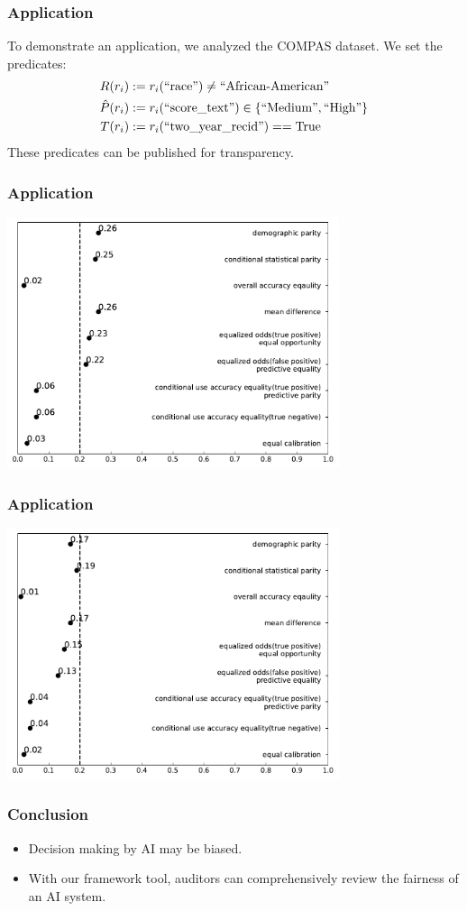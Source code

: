 \documentclass{beamer}
\DeclarePairedDelimiter{\set}{\{}{\}}
\begin{document}
\begin{frame}
    \frametitle{Application}
    To demonstrate an application, we analyzed the COMPAS dataset.
    We set the predicates:
    \begin{align*}
        \priv(r_i) & := r_i(\text{``race''}) \neq \text{``African-American''}\\
        \pos(r_i)  & := r_i(\text{``score\_text''}) \in \set{\text{``Medium''},\text{``High''}}\\
        \tru(r_i)  & := r_i(\text{``two\_year\_recid''}) == \text{True}
    \end{align*}
    These predicates can be published for transparency.
\end{frame}

\begin{frame}
    \frametitle{Application}
    \centering
    \includegraphics[width=0.73\textwidth]{African-American}
\end{frame}

\begin{frame}
    \frametitle{Application}
    \centering
    \includegraphics[width=0.73\textwidth]{Caucasian}
\end{frame}

\begin{frame}
    \frametitle{Conclusion}
    \begin{itemize}
        \item Decision making by AI may be biased.
        \item With our framework tool, auditors can comprehensively
        review the fairness of an AI system.
    \end{itemize}
\end{frame}
\end{document}
